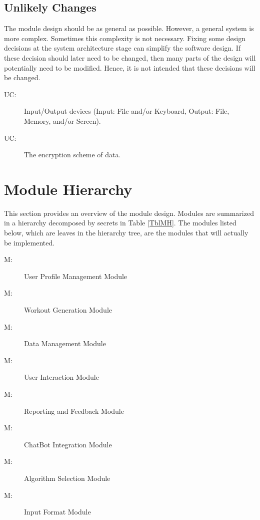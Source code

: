 \documentclass[12pt, titlepage]{article}
\newcounter{ucnum}
\newcommand{\uctheucnum}{UC\theucnum}
\newcounter{mnum}
\newcommand{\mthemnum}{M\themnum}
\begin{document}
\subsection{Unlikely Changes} \label{SecUchange}

The module design should be as general as possible. However, a general system is
more complex. Sometimes this complexity is not necessary. Fixing some design
decisions at the system architecture stage can simplify the software design. If
these decision should later need to be changed, then many parts of the design
will potentially need to be modified. Hence, it is not intended that these
decisions will be changed.

\begin{description}
\item[ \uctheucnum \label{ucIO}:] Input/Output devices
  (Input: File and/or Keyboard, Output: File, Memory, and/or Screen).
\item [ \uctheucnum \label{ucEncryption}:] The encryption scheme of data.
\end{description}

\section{Module Hierarchy} \label{SecMH}

This section provides an overview of the module design. Modules are summarized
in a hierarchy decomposed by secrets in Table \ref{TblMH}. The modules listed
below, which are leaves in the hierarchy tree, are the modules that will
actually be implemented.

\begin{description}
\item [ \mthemnum \label{mUP}:] User Profile Management Module
\item [ \mthemnum \label{mWG}:] Workout Generation Module
\item [ \mthemnum \label{mDM}:] Data Management Module
\item [ \mthemnum \label{mUI}:] User Interaction Module
\item [ \mthemnum \label{mRF}:] Reporting and Feedback Module
\item [ \mthemnum \label{mCI}:] ChatBot Integration Module
\item [ \mthemnum \label{mAS}:] Algorithm Selection Module
\item [ \mthemnum \label{mIF}:] Input Format Module
\end{description}
\end{document}
